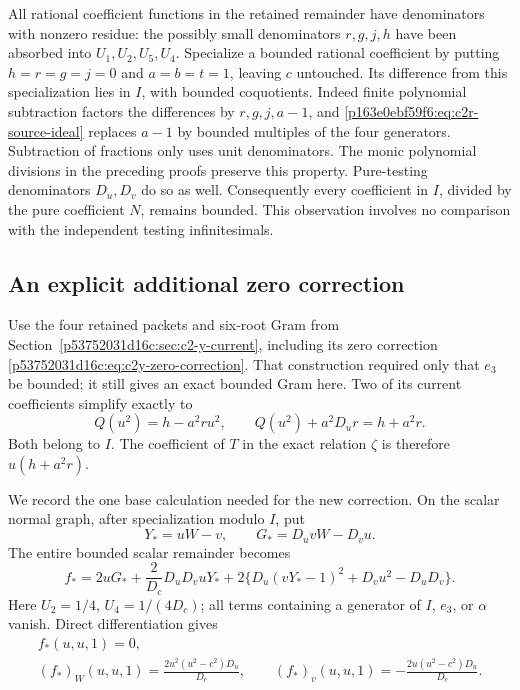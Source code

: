 All rational coefficient functions in the retained remainder have
denominators with nonzero residue: the possibly small denominators
$r,g,j,h$ have been absorbed into $U_1,U_2,U_5,U_4$.  Specialize a
bounded rational coefficient by putting $h=r=g=j=0$ and $a=b=t=1$,
leaving $c$ untouched.  Its difference from this specialization lies in
$I$, with bounded coquotients.  Indeed finite polynomial subtraction
factors the differences by $r,g,j,a-1$, and
\eqref{p163e0ebf59f6:eq:c2r-source-ideal} replaces $a-1$ by bounded multiples of the
four generators.  Subtraction of fractions only uses unit denominators.
The monic polynomial divisions in the preceding proofs preserve this
property.  Pure-testing denominators $D_u,D_v$ do so as well.
Consequently every coefficient in $I$, divided by the pure coefficient
$N$, remains bounded.  This observation involves no comparison with
the independent testing infinitesimals.

\subsection{An explicit additional zero correction}
Use the four retained packets and six-root Gram from
Section~\ref{p53752031d16c:sec:c2-y-current}, including its zero correction
\eqref{p53752031d16c:eq:c2y-zero-correction}.  That construction required only that
$e_3$ be bounded; it still gives an exact bounded Gram here.  Two of its
current coefficients simplify exactly to
\begin{equation}
Q(u^2)=h-a^2ru^2,\qquad Q(u^2)+a^2D_ur=h+a^2r.
\label{p163e0ebf59f6:eq:c2r-QJ}
\end{equation}
Both belong to $I$.  The coefficient of $T$ in the exact relation
$\zeta$ is therefore $u(h+a^2r)$.

We record the one base calculation needed for the new correction.
On the scalar normal graph, after specialization modulo $I$, put
\[
Y_*=uW-v,\qquad G_*=D_uvW-D_vu.
\]
The entire bounded scalar remainder becomes
\begin{equation}
f_*=2uG_*+\frac{2}{D_c}D_uD_vuY_*
 +2\{D_u(vY_*-1)^2+D_vu^2-D_uD_v\}.
\label{p163e0ebf59f6:eq:c2r-base-polynomial}
\end{equation}
Here $U_2=1/4$, $U_4=1/(4D_c)$; all terms containing a generator of
$I$, $e_3$, or $\alpha$ vanish.  Direct differentiation gives
\begin{equation}
\begin{gathered}
f_*(u,u,1)=0,\\
(f_*)_W(u,u,1)=\frac{2u^2(u^2-c^2)D_u}{D_c},\qquad
(f_*)_v(u,u,1)=-\frac{2u(u^2-c^2)D_u}{D_c}.
\end{gathered}
\label{p163e0ebf59f6:eq:c2r-base-derivatives}
\end{equation}


